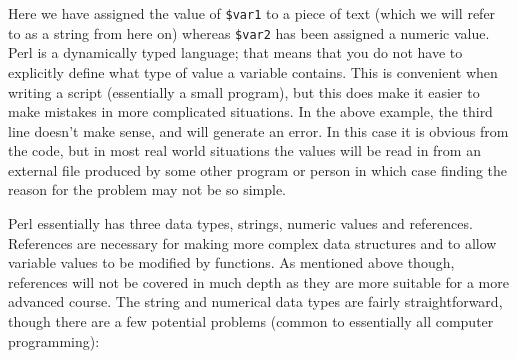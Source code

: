 \documentclass[11pt]{article}
\begin{document}
Here we have assigned the value of \texttt{\$var1} to a piece of text (which we
will refer to as a string from here on) whereas \texttt{\$var2} has been
assigned a numeric value. Perl is a dynamically typed language; that
means that you do not have to explicitly define what type of value a
variable contains. This is convenient when writing a script (essentially
a small program), but this does make it easier to make mistakes in more
complicated situations. In the above example, the third line doesn't
make sense, and will generate an error. In this case it is obvious from
the code, but in most real world situations the values will be read in
from an external file produced by some other program or person in which
case finding the reason for the problem may not be so simple.

Perl essentially has three data types, strings, numeric values and
references. References are necessary for making more complex data
structures and to allow variable values to be modified by functions. As
mentioned above though, references will not be covered in much depth as
they are more suitable for a more advanced course. The string and
numerical data types are fairly straightforward, though there are a few
potential problems (common to essentially all computer programming):
\end{document}
